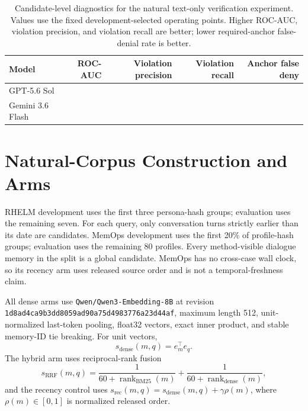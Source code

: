 \documentclass{article}
\begin{document}
\begin{table}[H]
  \centering
  \small
  \caption{Candidate-level diagnostics for the natural text-only verification
  experiment.  Values use the fixed development-selected operating points.  Higher
  ROC-AUC, violation precision, and violation recall are better; lower required-anchor
  false-denial rate is better.}
  \label{tab:text-inference-diagnostics}
  \begin{tabular}{lrrrr}
    \toprule
    Model & ROC-AUC & Violation precision & Violation recall & Anchor false deny \\
    \midrule
    GPT-5.6 Sol & \OpenAIInferredRocAuc{} & \OpenAIInferredViolationPrecision{} &
      \OpenAIInferredViolationRecall{} & \OpenAIInferredAnchorFalseDeny{} \\
    Gemini 3.6 Flash & \GeminiInferredRocAuc{} & \GeminiInferredViolationPrecision{} &
      \GeminiInferredViolationRecall{} & \GeminiInferredAnchorFalseDeny{} \\
    \bottomrule
  \end{tabular}
\end{table}

\section{Natural-Corpus Construction and Arms}
\label{app:arms}

RHELM development uses the first three persona-hash groups; evaluation uses the
remaining seven.  For each query, only conversation turns strictly earlier than its
date are candidates.  MemOps development uses the first 20\% of profile-hash groups;
evaluation uses the remaining 80 profiles.  Every method-visible dialogue memory in
the split is a global candidate.  MemOps has no cross-case wall clock, so its recency
arm uses released source order and is not a temporal-freshness claim.

All dense arms use \texttt{Qwen/Qwen3-Embedding-8B} at revision
\nolinkurl{1d8ad4ca9b3dd8059ad90a75d4983776a23d44af}, maximum length 512,
unit-normalized last-token pooling, float32 vectors, exact inner product, and stable
memory-ID tie breaking.  For unit vectors,
\[
s_{\mathrm{dense}}(m,q)=e_m^\top e_q.
\]
The hybrid arm uses reciprocal-rank fusion
\[
s_{\mathrm{RRF}}(m,q)=
\frac{1}{60+\operatorname{rank}_{\mathrm{BM25}}(m)}
+
\frac{1}{60+\operatorname{rank}_{\mathrm{dense}}(m)},
\]
and the recency control uses
$s_{\mathrm{rec}}(m,q)=s_{\mathrm{dense}}(m,q)+\gamma\rho(m)$, where
$\rho(m)\in[0,1]$ is normalized released order.
\end{document}
